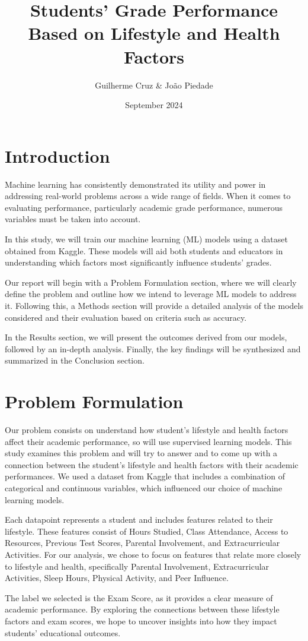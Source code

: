\documentclass{article}
\title{Students' Grade Performance Based on Lifestyle and Health Factors}
\author{Guilherme Cruz & João Piedade}
\date{September 2024}
\begin{document}
\section{Introduction}
\quad Machine learning has consistently demonstrated its utility and power in addressing real-world problems across a wide range of fields. When it comes to evaluating performance, particularly academic grade performance, numerous variables must be taken into account.

In this study, we will train our machine learning (ML) models using a dataset obtained from Kaggle. These models will aid both students and educators in understanding which factors most significantly influence students' grades.

Our report will begin with a Problem Formulation section, where we will clearly define the problem and outline how we intend to leverage ML models to address it. Following this, a Methods section will provide a detailed analysis of the models considered and their evaluation based on criteria such as accuracy.

In the Results section, we will present the outcomes derived from our models, followed by an in-depth analysis. Finally, the key findings will be synthesized and summarized in the Conclusion section.

\section{Problem Formulation}
\quad Our problem consists on understand how student's lifestyle and health factors affect their academic performance, so will use supervised learning models.
This study examines this problem and will try to answer and to come up with a connection between the student's lifestyle and health factors with their academic performances. We used a dataset from Kaggle that includes a combination of categorical and continuous variables, which influenced our choice of machine learning models.


Each datapoint represents a student and includes features related to their lifestyle. These features consist of Hours Studied, Class Attendance, Access to Resources, Previous Test Scores, Parental Involvement, and Extracurricular Activities. For our analysis, we chose to focus on features that relate more closely to lifestyle and health, specifically Parental Involvement, Extracurricular Activities, Sleep Hours, Physical Activity, and Peer Influence.

The label we selected is the Exam Score, as it provides a clear measure of academic performance. By exploring the connections between these lifestyle factors and exam scores, we hope to uncover insights into how they impact students’ educational outcomes.
\end{document}

